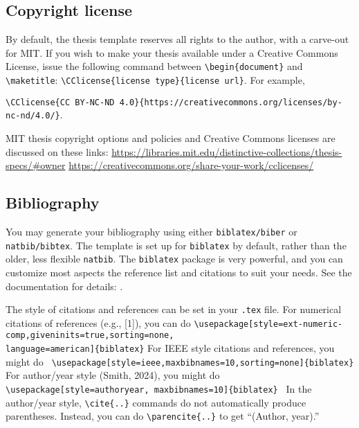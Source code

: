 \documentclass[11pt]{article}
\begin{document}
\subsection{Copyright license}
By default, the thesis template reserves all rights to the author, with a carve-out for MIT.  If you wish to make your thesis available under a Creative Commons License, issue the following command between
\verb|\begin{document}| and \verb|\maketitle|: \verb|\CClicense{license type}{license url}|.  For example,
 
\vskip 5pt
\noindent\quad\verb|\CClicense{CC BY-NC-ND 4.0}{https://creativecommons.org/licenses/by-nc-nd/4.0/}|.

\vskip 5pt
\noindent MIT thesis copyright options and policies and Creative Commons licenses are discussed on these links:
\indent\url{https://libraries.mit.edu/distinctive-collections/thesis-specs/#owner}\newline
\indent\url{https://creativecommons.org/share-your-work/cclicenses/}

\subsection{Bibliography}
You may generate your bibliography using either \texttt{biblatex/biber} or \texttt{natbib/bibtex}.  The template is set up for \texttt{biblatex} by default, rather than the older, less flexible \texttt{natbib}.  The \texttt{biblatex} package is very powerful, and you can customize most aspects the reference list and citations to suit your needs. See the documentation for details: .

The style of citations and references can be set in your \texttt{.tex} file. For numerical citations of references (e.g., [1]), you can do
\vskip 5pt
\verb|\usepackage[style=ext-numeric-comp,giveninits=true,sorting=none,| \\
	\hspace*{1.5cm} \verb|language=american]{biblatex}|
\vskip 5pt
\noindent For IEEE style citations and references, you might do
\vskip 5pt
\verb| \usepackage[style=ieee,maxbibnames=10,sorting=none]{biblatex}|
\vskip 5pt
\noindent For author/year style (Smith, 2024), you might do
\vskip 5pt
\verb| \usepackage[style=authoryear, maxbibnames=10]{biblatex} |
\vskip 5pt
\noindent In the author/year style, \verb|\cite{..}| commands do not automatically produce parentheses. Instead, you can do
\verb|\parencite{..}| to get ``(Author, year).''
\end{document}
